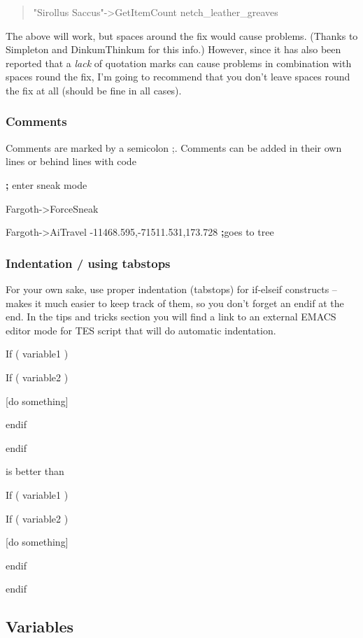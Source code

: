 \documentclass[
]{article}
\begin{document}
\begin{quote}
"Sirollus Saccus"-\textgreater GetItemCount netch\_leather\_greaves
\end{quote}

The above will work, but spaces around the fix would cause problems.
(Thanks to Simpleton and DinkumThinkum for this info.) However, since it
has also been reported that a \emph{lack} of quotation marks can cause
problems in combination with spaces round the fix, I'm going to
recommend that you don't leave spaces round the fix at all (should be
fine in all cases).

\hypertarget{comments}{%
\subsubsection{Comments}\label{comments}}

Comments are marked by a semicolon ;. Comments can be added in their own
lines or behind lines with code

\textbf{;} enter sneak mode

Fargoth-\textgreater ForceSneak

Fargoth-\textgreater AiTravel -11468.595,-71511.531,173.728
\textbf{;}goes to tree

\hypertarget{indentation-using-tabstops}{%
\subsubsection{Indentation / using
tabstops}\label{indentation-using-tabstops}}

For your own sake, use proper indentation (tabstops) for if-elseif
constructs -- makes it much easier to keep track of them, so you don't
forget an endif at the end. In the tips and tricks section you will find
a link to an external EMACS editor mode for TES script that will do
automatic indentation.

If ( variable1 )

If ( variable2 )

{[}do something{]}

endif

endif

is better than

If ( variable1 )

If ( variable2 )

{[}do something{]}

endif

endif

\hypertarget{variables}{%
\subsection{Variables}\label{variables}}
\end{document}
